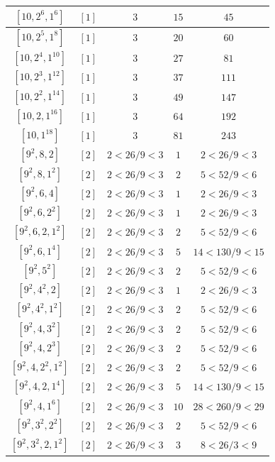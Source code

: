 \documentclass{article}%
\begin{document}
\begin{center}
\begin{longtable}{||c|c|c|c|c||}
$[10, 2^{6}, 1^{6}]$ & $[1]$ & $3$ & $15$ & $45$ \\ \hline 
$[10, 2^{5}, 1^{8}]$ & $[1]$ & $3$ & $20$ & $60$ \\ \hline 
$[10, 2^{4}, 1^{10}]$ & $[1]$ & $3$ & $27$ & $81$ \\ \hline 
$[10, 2^{3}, 1^{12}]$ & $[1]$ & $3$ & $37$ & $111$ \\ \hline 
$[10, 2^{2}, 1^{14}]$ & $[1]$ & $3$ & $49$ & $147$ \\ \hline 
$[10, 2, 1^{16}]$ & $[1]$ & $3$ & $64$ & $192$ \\ \hline 
$[10, 1^{18}]$ & $[1]$ & $3$ & $81$ & $243$ \\ \hline 
$[9^{2}, 8, 2]$ & $[2]$ & $2 < 26/9 < 3$ & $1$ & $2 < 26/9 < 3$ \\ \hline 
$[9^{2}, 8, 1^{2}]$ & $[2]$ & $2 < 26/9 < 3$ & $2$ & $5 < 52/9 < 6$ \\ \hline 
$[9^{2}, 6, 4]$ & $[2]$ & $2 < 26/9 < 3$ & $1$ & $2 < 26/9 < 3$ \\ \hline 
$[9^{2}, 6, 2^{2}]$ & $[2]$ & $2 < 26/9 < 3$ & $1$ & $2 < 26/9 < 3$ \\ \hline 
$[9^{2}, 6, 2, 1^{2}]$ & $[2]$ & $2 < 26/9 < 3$ & $2$ & $5 < 52/9 < 6$ \\ \hline 
$[9^{2}, 6, 1^{4}]$ & $[2]$ & $2 < 26/9 < 3$ & $5$ & $14 < 130/9 < 15$ \\ \hline 
$[9^{2}, 5^{2}]$ & $[2]$ & $2 < 26/9 < 3$ & $2$ & $5 < 52/9 < 6$ \\ \hline 
$[9^{2}, 4^{2}, 2]$ & $[2]$ & $2 < 26/9 < 3$ & $1$ & $2 < 26/9 < 3$ \\ \hline 
$[9^{2}, 4^{2}, 1^{2}]$ & $[2]$ & $2 < 26/9 < 3$ & $2$ & $5 < 52/9 < 6$ \\ \hline 
$[9^{2}, 4, 3^{2}]$ & $[2]$ & $2 < 26/9 < 3$ & $2$ & $5 < 52/9 < 6$ \\ \hline 
$[9^{2}, 4, 2^{3}]$ & $[2]$ & $2 < 26/9 < 3$ & $2$ & $5 < 52/9 < 6$ \\ \hline 
$[9^{2}, 4, 2^{2}, 1^{2}]$ & $[2]$ & $2 < 26/9 < 3$ & $2$ & $5 < 52/9 < 6$ \\ \hline 
$[9^{2}, 4, 2, 1^{4}]$ & $[2]$ & $2 < 26/9 < 3$ & $5$ & $14 < 130/9 < 15$ \\ \hline 
$[9^{2}, 4, 1^{6}]$ & $[2]$ & $2 < 26/9 < 3$ & $10$ & $28 < 260/9 < 29$ \\ \hline 
$[9^{2}, 3^{2}, 2^{2}]$ & $[2]$ & $2 < 26/9 < 3$ & $2$ & $5 < 52/9 < 6$ \\ \hline 
$[9^{2}, 3^{2}, 2, 1^{2}]$ & $[2]$ & $2 < 26/9 < 3$ & $3$ & $8 < 26/3 < 9$ \\ \hline 

\end{longtable}
\end{center}
\end{document}
